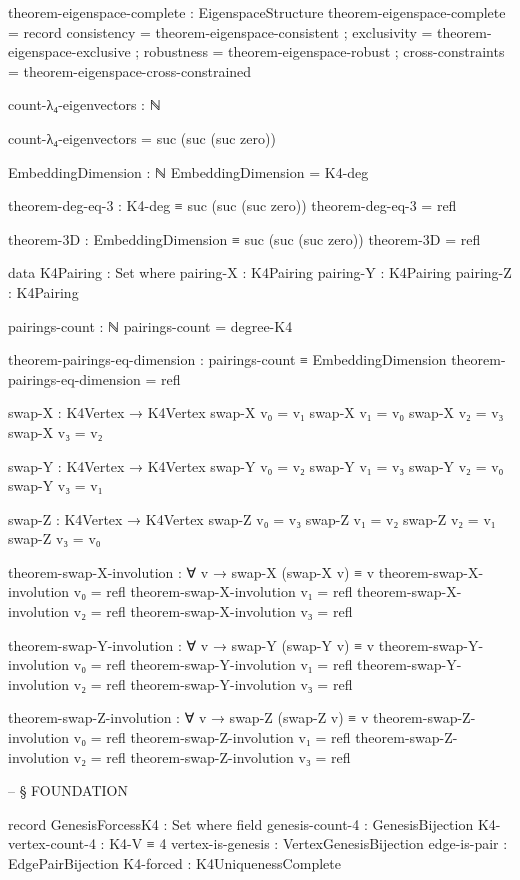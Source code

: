 \documentclass[11pt,a4paper]{book}
\begin{document}
\begin{code}
theorem-eigenspace-complete : EigenspaceStructure
theorem-eigenspace-complete = record
  { consistency = theorem-eigenspace-consistent
  ; exclusivity = theorem-eigenspace-exclusive
  ; robustness = theorem-eigenspace-robust
  ; cross-constraints = theorem-eigenspace-cross-constrained
  }

count-λ₄-eigenvectors : ℕ

count-λ₄-eigenvectors = suc (suc (suc zero))

EmbeddingDimension : ℕ
EmbeddingDimension = K4-deg

theorem-deg-eq-3 : K4-deg ≡ suc (suc (suc zero))
theorem-deg-eq-3 = refl

theorem-3D : EmbeddingDimension ≡ suc (suc (suc zero))
theorem-3D = refl

data K4Pairing : Set where
  pairing-X : K4Pairing
  pairing-Y : K4Pairing
  pairing-Z : K4Pairing

pairings-count : ℕ
pairings-count = degree-K4

theorem-pairings-eq-dimension : pairings-count ≡ EmbeddingDimension
theorem-pairings-eq-dimension = refl

swap-X : K4Vertex → K4Vertex
swap-X v₀ = v₁
swap-X v₁ = v₀
swap-X v₂ = v₃
swap-X v₃ = v₂

swap-Y : K4Vertex → K4Vertex
swap-Y v₀ = v₂
swap-Y v₁ = v₃
swap-Y v₂ = v₀
swap-Y v₃ = v₁

swap-Z : K4Vertex → K4Vertex
swap-Z v₀ = v₃
swap-Z v₁ = v₂
swap-Z v₂ = v₁
swap-Z v₃ = v₀

theorem-swap-X-involution : ∀ v → swap-X (swap-X v) ≡ v
theorem-swap-X-involution v₀ = refl
theorem-swap-X-involution v₁ = refl
theorem-swap-X-involution v₂ = refl
theorem-swap-X-involution v₃ = refl

theorem-swap-Y-involution : ∀ v → swap-Y (swap-Y v) ≡ v
theorem-swap-Y-involution v₀ = refl
theorem-swap-Y-involution v₁ = refl
theorem-swap-Y-involution v₂ = refl
theorem-swap-Y-involution v₃ = refl

theorem-swap-Z-involution : ∀ v → swap-Z (swap-Z v) ≡ v
theorem-swap-Z-involution v₀ = refl
theorem-swap-Z-involution v₁ = refl
theorem-swap-Z-involution v₂ = refl
theorem-swap-Z-involution v₃ = refl


-- § FOUNDATION

record GenesisForcessK4 : Set where
  field
    genesis-count-4 : GenesisBijection
    K4-vertex-count-4 : K4-V ≡ 4
    vertex-is-genesis : VertexGenesisBijection
    edge-is-pair : EdgePairBijection
    K4-forced : K4UniquenessComplete


\end{code}
\end{document}
